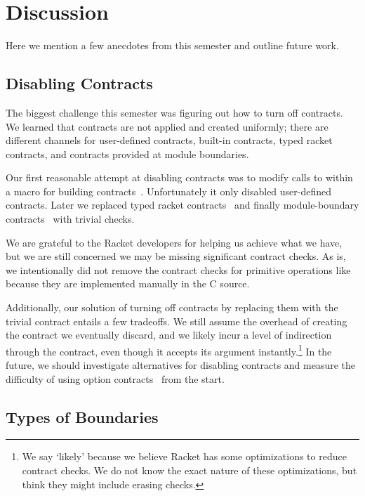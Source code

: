 \section{Discussion}
\label{discussion}

Here we mention a few anecdotes from this semester and outline future work.

\subsection{Disabling Contracts}
\label{disabling-contracts}

The biggest challenge this semester was figuring out how to turn off contracts.
We learned that contracts are not applied and created uniformly; there are different channels for user-defined contracts, built-in contracts, typed racket contracts, and contracts provided at module boundaries.

Our first reasonable attempt at disabling contracts was to modify calls to  within a macro for building contracts~\cite{no-contracts1}.
Unfortunately it only disabled user-defined contracts.
Later we replaced typed racket contracts~\cite{no-contracts2} and finally module-boundary contracts~\cite{no-contracts3} with trivial checks.

We are grateful to the Racket developers for helping us achieve what we have, but we are still concerned we may be missing significant contract checks.
As is, we intentionally did not remove the contract checks for primitive operations like \mono{+} because they are implemented manually in the C source.

Additionally, our solution of turning off contracts by replacing them with the trivial  contract entails a few tradeoffs.
We still assume the overhead of creating the contract we eventually discard, and we likely incur a level of indirection through the  contract, even though it accepts its argument instantly.\footnote{We say `likely' because we believe Racket has some optimizations to reduce contract checks. We do not know the exact nature of these optimizations, but think they might include erasing  checks.}
In the future, we should investigate alternatives for disabling contracts and measure the difficulty of using option contracts~\cite{option-contracts} from the start.

\subsection{Types of Boundaries}
\label{types-of-boundaries}


